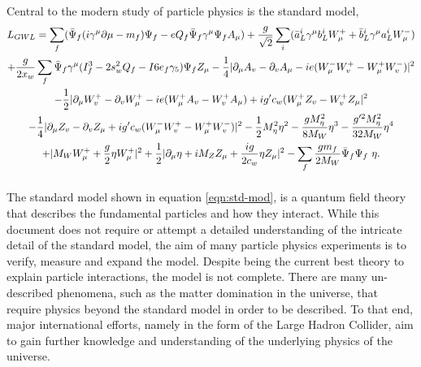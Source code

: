     Central to the modern study of particle physics is the standard model,
    \begin{multline} \label{eqn:std-mod}
      L_{GWL} = \sum_{f} ( \bar{\Psi}_{f} ( i \gamma^\mu \partial \mu - m_{f} ) \Psi_{f} - eQ_{f} \bar{\Psi}_{f} \gamma^\mu \Psi_{f} A_{\mu} ) + \frac{g}{\sqrt{2}} \sum_{i} ( \bar{a}^i_L \gamma^\mu b^i_L W^+_\mu + \bar{b}^i_L \gamma^\mu a^i_L W^-_\mu )                        \\                           
              + \frac{g}{2x_w} \sum_f \bar{\Psi}_f \gamma^\mu ( I^3_f - 2s^2_w Q_f - I6e_f \gamma_5 ) \Psi_f Z_\mu - \frac{1}{4} | \partial_\mu A_v - \partial_v A_\mu - ie(W^-_\mu W^+_v - W^+_\mu W^-_v ) |^2                                         \\                                     
              - \frac{1}{2} | \partial_\mu W^+_v - \partial_v W^+_\mu - ie ( W^+_\mu A_v - W^+_v A_\mu ) + ig' c_w (W^+_\mu Z_v - W^+_v Z_\mu |^2 \\
              - \frac{1}{4} | \partial_\mu Z_v - \partial_v Z_\mu + ig' c_w (W^-_\mu W^+_v - W^+_\mu W^-_v ) |^2 - \frac{1}{2} M^2_\eta \eta^2  - \frac{gM^2_\eta}{8M_W} \eta^3  - \frac{g'^2 M^2_\eta}{32M_W}\eta^4    \\     
              + | M_W W^+_\mu + \frac{g}{2} \eta W^+_\mu |^2 + \frac{1}{2} | \partial_\mu \eta + i M_Z Z_\mu + \frac{ig}{2c_w} \eta Z_\mu |^2 - \sum_f \frac{g m_f}{2 M_W} \bar{\Psi}_f \Psi_f\ \eta. 
              \vspace{1em}                                                                               
    \end{multline}
    The standard model shown in equation \ref{eqn:std-mod}, is a quantum field theory that describes the fundamental particles and how they interact.
    While this document does not require or attempt a detailed understanding of the intricate detail of the standard model,
    the aim of many particle physics experiments is to verify, measure and expand the model.
    Despite being the current best theory to explain particle interactions, the model is not complete.
    There are many un-described phenomena, such as the matter domination in the universe, that require physics beyond the standard model in order to be described.
    To that end, major international efforts, namely in the form of the Large Hadron Collider, aim to gain further knowledge and understanding of the underlying physics of the universe. \cite{ref:std}

